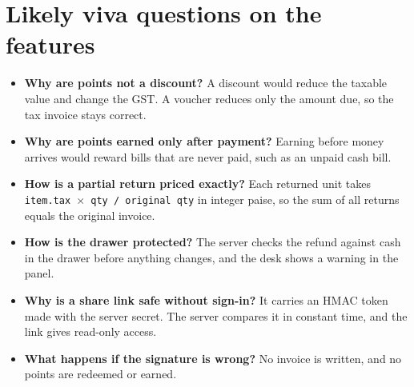 \documentclass[10pt,a4paper]{article}
\newcommand{\key}[1]{\textbf{#1}}
\begin{document}
\section{Likely viva questions on the features}
\begin{itemize}
  \item \key{Why are points not a discount?} A discount would reduce the taxable value and change the GST. A voucher reduces only the amount due, so the tax invoice stays correct.
  \item \key{Why are points earned only after payment?} Earning before money arrives would reward bills that are never paid, such as an unpaid cash bill.
  \item \key{How is a partial return priced exactly?} Each returned unit takes \texttt{item.tax $\times$ qty / original qty} in integer paise, so the sum of all returns equals the original invoice.
  \item \key{How is the drawer protected?} The server checks the refund against cash in the drawer before anything changes, and the desk shows a warning in the panel.
  \item \key{Why is a share link safe without sign-in?} It carries an HMAC token made with the server secret. The server compares it in constant time, and the link gives read-only access.
  \item \key{What happens if the signature is wrong?} No invoice is written, and no points are redeemed or earned.
\end{itemize}
\end{document}
